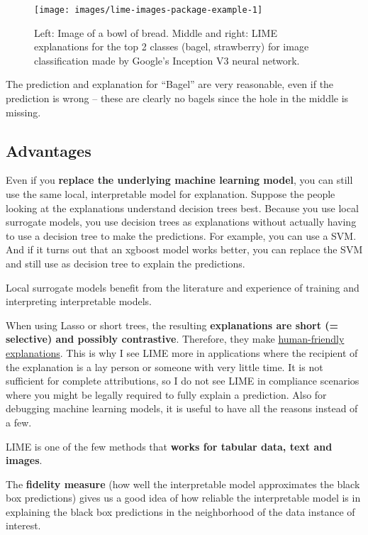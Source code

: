 \documentclass[12pt,]{krantz}
\begin{document}
\begin{figure}

{\centering \texttt{[image: images/lime-images-package-example-1]} 

}

\caption{Left: Image of a bowl of bread. Middle and right: LIME explanations for the top 2 classes (bagel, strawberry) for image classification made by Google's Inception V3 neural network.}\label{fig:lime-images-package-example-include}
\end{figure}

The prediction and explanation for ``Bagel'' are very reasonable, even
if the prediction is wrong -- these are clearly no bagels since the hole
in the middle is missing.

\subsection{Advantages}\label{advantages-13}

Even if you \textbf{replace the underlying machine learning model}, you
can still use the same local, interpretable model for explanation.
Suppose the people looking at the explanations understand decision trees
best. Because you use local surrogate models, you use decision trees as
explanations without actually having to use a decision tree to make the
predictions. For example, you can use a SVM. And if it turns out that an
xgboost model works better, you can replace the SVM and still use as
decision tree to explain the predictions.

Local surrogate models benefit from the literature and experience of
training and interpreting interpretable models.

When using Lasso or short trees, the resulting \textbf{explanations are
short (= selective) and possibly contrastive}. Therefore, they make
\protect\hyperlink{explanation}{human-friendly explanations}. This is
why I see LIME more in applications where the recipient of the
explanation is a lay person or someone with very little time. It is not
sufficient for complete attributions, so I do not see LIME in compliance
scenarios where you might be legally required to fully explain a
prediction. Also for debugging machine learning models, it is useful to
have all the reasons instead of a few.

LIME is one of the few methods that \textbf{works for tabular data, text
and images}.

The \textbf{fidelity measure} (how well the interpretable model
approximates the black box predictions) gives us a good idea of how
reliable the interpretable model is in explaining the black box
predictions in the neighborhood of the data instance of interest.
\end{document}
